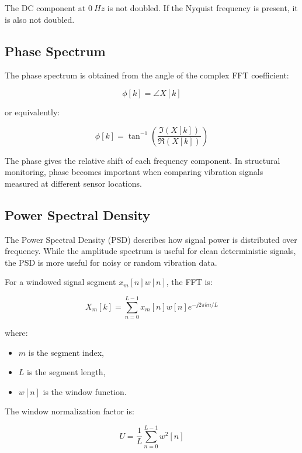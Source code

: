\documentclass[11pt,a4paper]{article}
\begin{document}
The DC component at \(0\ \si{Hz}\) is not doubled. If the Nyquist frequency is present, it is also not doubled.

\subsection{Phase Spectrum}

The phase spectrum is obtained from the angle of the complex FFT coefficient:

\begin{equation}
    \phi[k] = \angle X[k]
\end{equation}

or equivalently:

\begin{equation}
    \phi[k] =
    \tan^{-1}
    \left(
        \frac{\Im(X[k])}{\Re(X[k])}
    \right)
\end{equation}

The phase gives the relative shift of each frequency component. In structural monitoring, phase becomes important when comparing vibration signals measured at different sensor locations.

\subsection{Power Spectral Density}

The Power Spectral Density (PSD) describes how signal power is distributed over frequency. While the amplitude spectrum is useful for clean deterministic signals, the PSD is more useful for noisy or random vibration data.

For a windowed signal segment \(x_m[n]w[n]\), the FFT is:

\begin{equation}
    X_m[k] =
    \sum_{n=0}^{L-1}
    x_m[n] w[n] e^{-j2\pi kn/L}
\end{equation}

where:

\begin{itemize}
    \item \(m\) is the segment index,
    \item \(L\) is the segment length,
    \item \(w[n]\) is the window function.
\end{itemize}

The window normalization factor is:

\begin{equation}
    U =
    \frac{1}{L}
    \sum_{n=0}^{L-1} w^2[n]
\end{equation}
\end{document}
